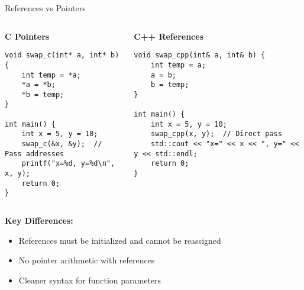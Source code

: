 \begin{frame}[fragile]{ References vs Pointers}
	\begin{columns}
		\begin{column}{0.5\textwidth}
			\textbf{C Pointers}
			\begin{verbatim}
void swap_c(int* a, int* b) {
    int temp = *a;
    *a = *b;
    *b = temp;
}

int main() {
    int x = 5, y = 10;
    swap_c(&x, &y);  // Pass addresses
    printf("x=%d, y=%d\n", x, y);
    return 0;
}
			\end{verbatim}
		\end{column}
		\begin{column}{0.5\textwidth}
			\textbf{C++ References}
			\begin{verbatim}
void swap_cpp(int& a, int& b) {
    int temp = a;
    a = b;
    b = temp;
}

int main() {
    int x = 5, y = 10;
    swap_cpp(x, y);  // Direct pass
    std::cout << "x=" << x << ", y=" << y << std::endl;
    return 0;
}
			\end{verbatim}
		\end{column}
	\end{columns}

	\vspace{0.5em}
	\textbf{Key Differences:}
	\begin{itemize}
		\item References must be initialized and cannot be reassigned
		\item No pointer arithmetic with references
		\item Cleaner syntax for function parameters
	\end{itemize}
\end{frame}

